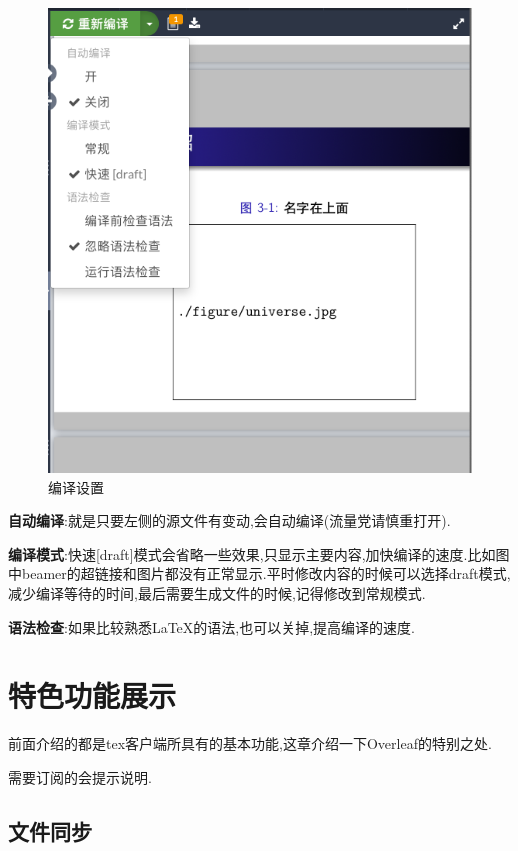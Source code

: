 \documentclass[]{ctexbook}
\begin{document}
\begin{figure}
\centering
\includegraphics{figure/compileset.png}
\caption{编译设置}
\end{figure}

\textbf{自动编译}:就是只要左侧的源文件有变动,会自动编译(流量党请慎重打开).

\textbf{编译模式}:快速{[}draft{]}模式会省略一些效果,只显示主要内容,加快编译的速度.比如图中beamer的超链接和图片都没有正常显示.平时修改内容的时候可以选择draft模式,减少编译等待的时间,最后需要生成文件的时候,记得修改到常规模式.

\textbf{语法检查}:如果比较熟悉LaTeX的语法,也可以关掉,提高编译的速度.

\hypertarget{section-13}{%
\chapter{特色功能展示}\label{section-13}}

前面介绍的都是tex客户端所具有的基本功能,这章介绍一下Overleaf的特别之处.

需要订阅的会提示说明.

\hypertarget{sync}{%
\section{文件同步}\label{sync}}
\end{document}
